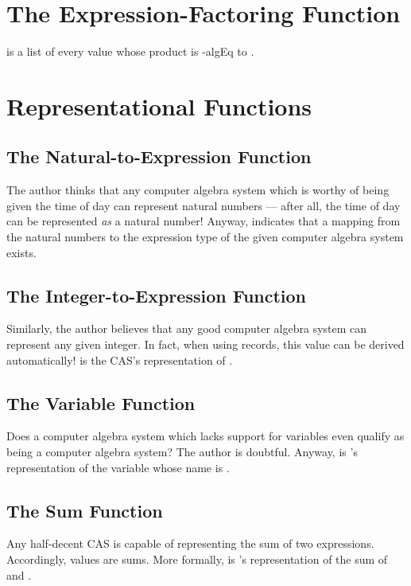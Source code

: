 \documentclass{report}
\begin{document}
\section{The Expression-Factoring Function}
   is a list of every value whose product is -\gls{algEq} to .

\section{Representational Functions}

\subsection{The Natural-to-Expression Function}
The author thinks that any computer algebra system which is worthy of being given the time of day can represent natural numbers --- after all, the time of day can be represented \emph{as} a natural number!  Anyway,  indicates that a mapping from the natural numbers to the expression type of the given computer algebra system exists.

\subsection{The Integer-to-Expression Function}
Similarly, the author believes that any good computer algebra system can represent any given integer.  In fact, when using  records, this value can be derived automatically!     is the  CAS's representation of .

\subsection{The Variable Function}
Does a computer algebra system which lacks support for variables even qualify as being a computer algebra system?  The author is doubtful.  Anyway,    is 's representation of the variable whose name is .

\subsection{The Sum Function}
Any half-decent CAS is capable of representing the sum of two expressions.  Accordingly, \AgdaField{\AgdaUnderscore{}+\AgdaUnderscore{}} values are sums.  More formally,     is 's representation of the sum of  and .
\end{document}

